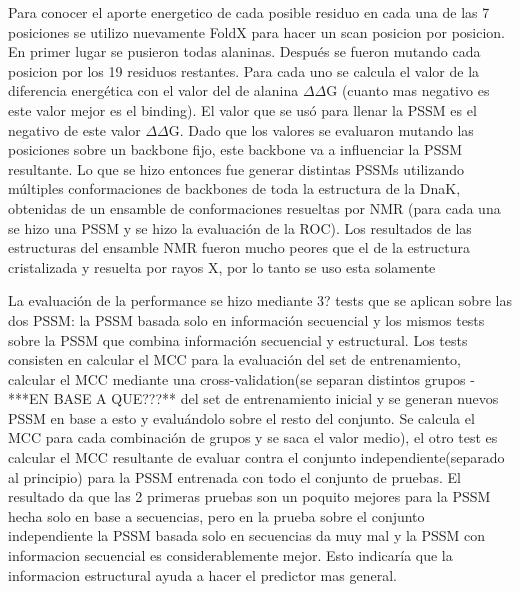 Para conocer el aporte energetico de cada posible residuo en cada una de las 7
posiciones se utilizo nuevamente FoldX para hacer un scan posicion por posicion.
En primer lugar se pusieron todas alaninas. Después se fueron mutando cada
posicion por los 19 residuos restantes. Para cada uno se calcula el valor de la 
diferencia energética con el valor del de alanina $\Delta\Delta$G (cuanto mas negativo es este 
valor mejor es el binding). El valor que se usó para llenar la PSSM es el negativo de 
este valor $\Delta\Delta$G.
Dado que los valores se evaluaron mutando las posiciones sobre un backbone fijo,
este backbone va a influenciar la PSSM resultante. Lo que se hizo entonces fue
generar distintas PSSMs utilizando múltiples conformaciones de backbones de 
toda la estructura de la DnaK, obtenidas de un ensamble de conformaciones 
resueltas por NMR (para cada una se hizo una PSSM y se hizo la evaluación de 
la ROC). Los resultados de las estructuras del ensamble NMR fueron mucho peores
que el de la estructura cristalizada y resuelta por rayos X, por lo tanto se uso esta
solamente


La evaluación de la performance se hizo mediante 3? tests que se aplican sobre las dos PSSM: la PSSM basada solo en información secuencial y los mismos tests sobre la PSSM que combina información secuencial y estructural. Los tests consisten en calcular el MCC para la evaluación del set de entrenamiento, calcular el MCC mediante una cross-validation(se separan distintos grupos -***EN BASE A QUE???** del set de entrenamiento inicial y se generan nuevos PSSM en base a esto y evaluándolo sobre el resto del conjunto. Se calcula el MCC para cada combinación de grupos y se saca el valor medio), el otro test es calcular el MCC resultante de evaluar contra el conjunto independiente(separado al principio) para la PSSM entrenada con todo el conjunto de pruebas.
El resultado da que las 2 primeras pruebas son un poquito mejores para la PSSM hecha solo en base a secuencias, pero en la prueba sobre el conjunto independiente la PSSM basada solo en secuencias da muy mal y la PSSM con informacion secuencial es considerablemente mejor. Esto indicaría que la informacion estructural ayuda a hacer el predictor mas general.










